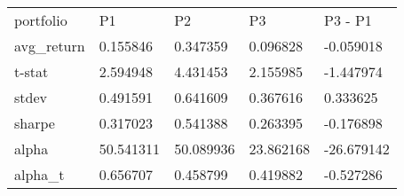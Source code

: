 \begin{tabular}{lllll}
\toprule
\midrule
portfolio & P1 & P2 & P3 & P3 - P1 \\
avg_return & 0.155846 & 0.347359 & 0.096828 & -0.059018 \\
t-stat & 2.594948 & 4.431453 & 2.155985 & -1.447974 \\
stdev & 0.491591 & 0.641609 & 0.367616 & 0.333625 \\
sharpe & 0.317023 & 0.541388 & 0.263395 & -0.176898 \\
alpha & 50.541311 & 50.089936 & 23.862168 & -26.679142 \\
alpha_t & 0.656707 & 0.458799 & 0.419882 & -0.527286 \\
\bottomrule
\end{tabular}
